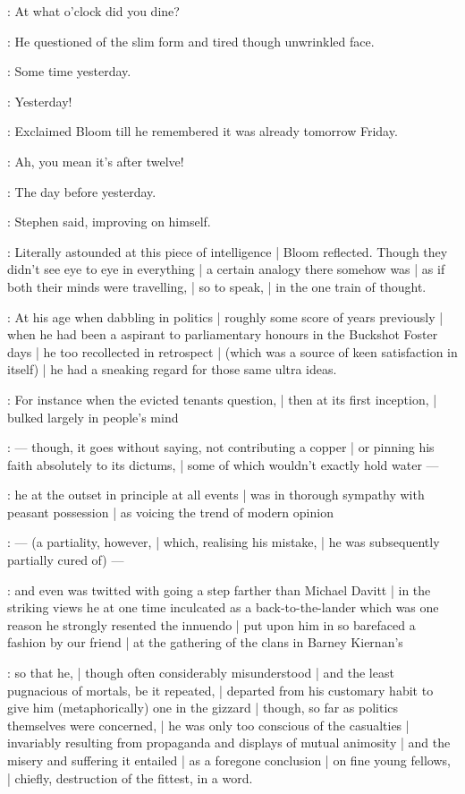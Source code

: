 \Bloom:
At what o'clock did you dine?

:
He questioned of the slim form and tired though unwrinkled face.

\Stephen:
Some time yesterday.

\Bloom:
Yesterday!

:
Exclaimed Bloom till he remembered it was already tomorrow Friday.

\Bloom:
Ah, you mean it's after twelve!

\Stephen:
The day before yesterday.

:
Stephen said, improving on himself.

:
Literally astounded at this piece of intelligence |
Bloom reflected.
Though they didn't see eye to eye in everything |
a certain analogy there somehow was |
as if both their minds were travelling, |
so to speak, |
in the one train of thought.

:
At his age when dabbling in politics |
roughly some score of years previously |
when he had been a  aspirant to parliamentary honours in the Buckshot Foster days |
he too recollected in retrospect |
(which was a source of keen satisfaction in itself) |
he had a sneaking regard for those same ultra ideas.

:
For instance when the evicted tenants question, |
then at its first inception, |
bulked largely in people's mind

:
    --- though, it goes without saying, not contributing a copper |
        or pinning his faith absolutely to its dictums, |
        some of which wouldn't exactly hold water ---

:
he at the outset in principle at all events |
was in thorough sympathy with peasant possession |
as voicing the trend of modern opinion

:
    --- (a partiality, however, |
        which, realising his mistake, |
        he was subsequently partially cured of) ---

:
and even was twitted with going a step farther than Michael Davitt |
in the striking views he at one time inculcated as a back-to-the-lander
which was one reason he strongly resented the innuendo |
put upon him in so barefaced a fashion by our friend |
at the gathering of the clans in Barney Kiernan's

:
so that he, |
though often considerably misunderstood |
and the least pugnacious of mortals, be it repeated, |
departed from his customary habit to give him (metaphorically) one in the gizzard |
though, so far as politics themselves were concerned, |
he was only too conscious of the casualties |
invariably resulting from propaganda and displays of mutual animosity |
and the misery and suffering it entailed |
as a foregone conclusion |
on fine young fellows, |
chiefly, destruction of the fittest, in a word.

